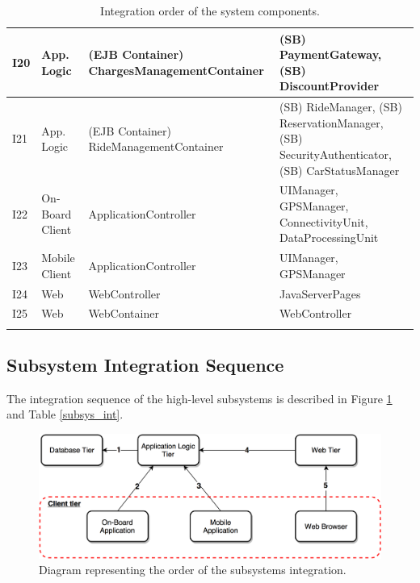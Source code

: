 \begin{longtable}{p{} | p{} | p{} | p{}}
\hline
I20 & App. Logic & (EJB Container) ChargesManagementContainer & (SB) PaymentGateway, (SB) DiscountProvider \\
\hline
I21 & App. Logic & (EJB Container) RideManagementContainer & (SB) RideManager, (SB) ReservationManager, (SB) SecurityAuthenticator, (SB) CarStatusManager \\
\hline
I22 & On-Board Client & ApplicationController & UIManager, GPSManager, ConnectivityUnit, DataProcessingUnit \\
\hline
I23 & Mobile Client & ApplicationController & UIManager, GPSManager \\
\hline
I24 & Web & WebController & JavaServerPages \\
\hline
I25 & Web & WebContainer & WebController \\
\hline
\caption{Integration order of the system components.}
\label{software_int}
\end{longtable}

\subsection{Subsystem Integration Sequence}
The integration sequence of the high-level subsystems is described in Figure \ref{h_level_subsys} and Table \ref{subsys_int}.

\begin{figure}[H]
\begin{center}
		\includegraphics[width=\textwidth]{./integration_strategy/diagrams/h_level_subsys.png}
		\caption{Diagram representing the order of the subsystems integration.}
		\label{h_level_subsys}
\end{center}
\end{figure}

